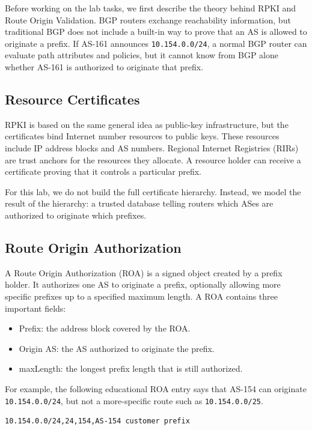Before working on the lab tasks, we first describe the theory behind RPKI and
Route Origin Validation. BGP routers exchange reachability information, but
traditional BGP does not include a built-in way to prove that an AS is allowed
to originate a prefix. If AS-161 announces \texttt{10.154.0.0/24}, a normal
BGP router can evaluate path attributes and policies, but it cannot know from
BGP alone whether AS-161 is authorized to originate that prefix.

\subsection{Resource Certificates}

RPKI is based on the same general idea as public-key infrastructure, but the
certificates bind Internet number resources to public keys. These resources
include IP address blocks and AS numbers. Regional Internet Registries (RIRs)
are trust anchors for the resources they allocate. A resource holder can receive
a certificate proving that it controls a particular prefix.

For this lab, we do not build the full certificate hierarchy. Instead, we model
the result of the hierarchy: a trusted database telling routers which ASes are
authorized to originate which prefixes.

\subsection{Route Origin Authorization}

A Route Origin Authorization (ROA) is a signed object created by a prefix
holder. It authorizes one AS to originate a prefix, optionally allowing more
specific prefixes up to a specified maximum length. A ROA contains three
important fields:

\begin{itemize}[noitemsep]
\item Prefix: the address block covered by the ROA.
\item Origin AS: the AS authorized to originate the prefix.
\item maxLength: the longest prefix length that is still authorized.
\end{itemize}

For example, the following educational ROA entry says that AS-154 can originate
\texttt{10.154.0.0/24}, but not a more-specific route such as
\texttt{10.154.0.0/25}.

\begin{lstlisting}
10.154.0.0/24,24,154,AS-154 customer prefix
\end{lstlisting}


